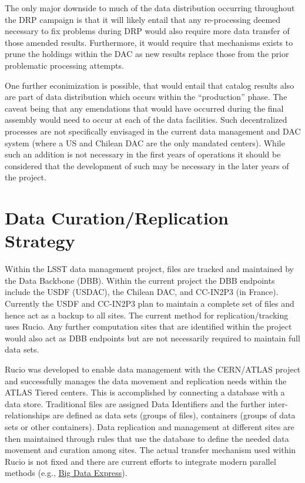The only major downside to much of the data distribution occurring throughout the DRP campaign is 
that it will likely entail that any re-processing deemed necessary to fix problems during DRP 
would also require more data transfer of those amended results.  Furthermore, it would require 
that mechanisms exists to prune the holdings within the DAC as new results replace those from the 
prior problematic processing attempts.  

One further econimization is possible, that would entail that catalog results also are part 
of data distribution which occurs within the ``production'' phase.  The caveat being that any 
emendations that would have occurred during the final assembly would need to occur at each of 
the data facilities.  Such decentralized processes are not specifically envisaged in the 
current data management and DAC system (where a US and Chilean DAC are the only mandated centers).
While such an addition is not necessary in the first years of operations it should be considered 
that the development of such may be necessary in the later years of the project.


\section{Data Curation/Replication Strategy\label{sec_method}}

Within the LSST data management project, files are tracked and maintained by the Data Backbone (DBB).
Within the current project the DBB endpoints include the USDF (USDAC), the Chilean DAC, and 
CC-IN2P3 (in France).  Currently the USDF and CC-IN2P3 plan to maintain a complete set of files 
and hence act as a backup to all sites.  The current method for replication/tracking uses Rucio.
Any further computation sites that are identified within the project would also act as DBB endpoints
but are not necessarily required to maintain full data sets. 

Rucio was developed to enable data management with the CERN/ATLAS project and successfully 
manages the data movement and replication needs within the ATLAS Tiered centers.  This is 
accomplished by connecting a database with a data store.  Traditional files are assigned 
Data Identifiers and the further inter-relationships are defined as data sets (groups of 
files), containers (groups of data sets or other containers).   Data replication and management 
at different sites are then maintained through rules that use the database to define the needed
data movement and curation among sites.  The actual transfer mechanism used within Rucio 
is not fixed and there are current efforts to integrate modern parallel methods 
(e.g., \href{https://bigdataexpress.fnal.gov}{Big Data Express}).  


